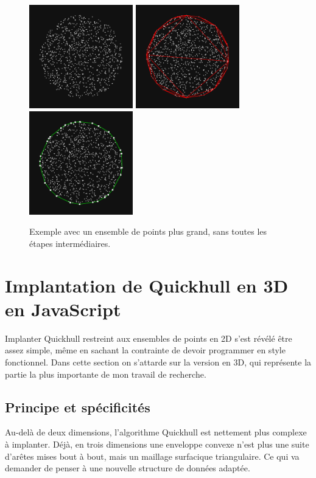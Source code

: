 \documentclass[]{article}
\begin{document}
\begin{figure}[H]
	\begin{center}
		\includegraphics[width=4.5cm]{qh2d/demo2d/frame_b0.png}
		\includegraphics[width=4.5cm]{qh2d/demo2d/frame_b1.png}
		\includegraphics[width=4.5cm]{qh2d/demo2d/frame_b2.png}
	\end{center}
	\caption{Exemple avec un ensemble de points plus grand, sans toutes les étapes intermédiaires.}
\end{figure}

\pagebreak
\section{Implantation de Quickhull en 3D en JavaScript}
Implanter Quickhull restreint aux ensembles de points en 2D s'est révélé être assez simple, même en sachant la contrainte de devoir programmer en style fonctionnel. Dans cette section on s'attarde sur la version en 3D, qui représente la partie la plus importante de mon travail de recherche.

\subsection{Principe et spécificités}
Au-delà de deux dimensions, l'algorithme Quickhull est nettement plus complexe à implanter. Déjà, en trois dimensions une enveloppe convexe n'est plus une suite d'arêtes mises bout à bout, mais un maillage surfacique triangulaire. Ce qui va demander de penser à une nouvelle structure de données adaptée.
\end{document}
